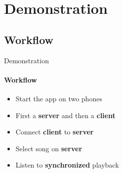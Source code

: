 \section{Demonstration}
\author{Mathias}
\subsection{Workflow}
\begin{frame}{Demonstration}
    \framesubtitle{Workflow}
    \begin{itemize}
        \item Start the app on two phones
        \item First a \textbf{server} and then a \textbf{client}
        \item Connect \textbf{client} to \textbf{server}
        \item Select song on \textbf{server}
        \item Listen to \textbf{synchronized} playback
    \end{itemize}
\end{frame}

